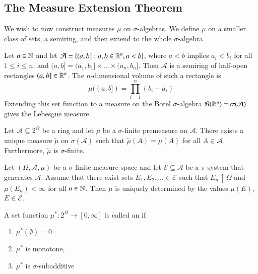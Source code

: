 \documentclass[12pt, a4paper, oneside, openright, titlepage]{book}
\begin{document}
\subsection{The Measure Extension Theorem}

We wish to now construct measures $\mu$ on $\sigma$-algebras. We define $\mu$ on a smaller class of sets, a semiring, and then extend to the whole $\sigma$-algebra.

\begin{eg}
    Let $n \in \mathbb N$ and let $\mathcal{A} = \{(a,b]:a,b \in \mathbb R^n, a < b\}$, where $a < b$ implies $a_i < b_i$ for all $1 \leq i \leq n$, and $(a,b] = (a_1,b_1]\times ... \times (a_n,b_n]$. Then $\mathcal{A}$ is a semiring of half-open rectangles $(a,b] \in \mathbb R^n$. The $n$-dimensional volume of such a rectangle is \begin{equation*}
        \mu((a,b]) = \prod_{i=1}^n(b_i - a_i)
    \end{equation*}
    Extending this set function to a measure on the Borel $\sigma$-algebra $\mathcal{B}(\mathbb R^n) = \sigma(\mathcal{A})$ gives the Lebesgue measure.
\end{eg}

\begin{namthm}[Caratheodory]
    Let $\mathcal{A} \subseteq 2^{\Omega}$ be a ring and let $\mu$ be a $\sigma$-finite premeasure on $\mathcal{A}$. There exists a unique measure $\tilde{\mu}$ on $\sigma(\mathcal{A})$ such that $\tilde{\mu}(A) = \mu(A)$ for all $A \in \mathcal{A}$. Furthermore, $\tilde{\mu}$ is $\sigma$-finite.
\end{namthm}

\begin{lem}
    Let $(\Omega,\mathcal{A},\mu)$ be a $\sigma$-finite measure space and let $\mathcal{E}\subseteq \mathcal{A}$ be a $\pi$-system that generates $\mathcal{A}$. Assume that there exist sets $E_1,E_2,... \in \mathcal{E}$ such that $E_n\uparrow \Omega$ and $\mu(E_n) < \infty$ for all $n \in \mathbb N$. Then $\mu$ is uniquely determined by the values $\mu(E)$, $E \in \mathcal{E}$.
\end{lem}


\begin{defn}
    A set function $\mu^*:2^{\Omega}\rightarrow [0,\infty]$ is called an  if \begin{enumerate}[label=\roman*]
        \item $\mu^*(\emptyset) = 0$ 
        \item $\mu^*$ is monotone,
        \item $\mu^*$ is $\sigma$-subadditive
    \end{enumerate}
\end{defn}
\end{document}
